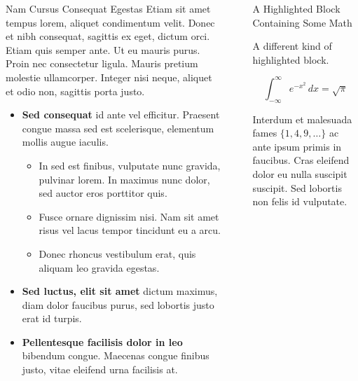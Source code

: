 \documentclass[final,20pt]{beamer}
\newlength{\sepwidth}
\newlength{\colwidth}
\newcommand{\separatorcolumn}{\begin{column}{\sepwidth}\end{column}}
\begin{document}
\begin{frame}[t]
\begin{columns}[t]
\begin{column}{\colwidth}
\begin{block}{Nam Cursus Consequat Egestas}
    Etiam sit amet tempus lorem, aliquet condimentum velit. Donec et nibh
    consequat, sagittis ex eget, dictum orci. Etiam quis semper ante. Ut eu
    mauris purus. Proin nec consectetur ligula. Mauris pretium molestie
    ullamcorper. Integer nisi neque, aliquet et odio non, sagittis porta justo.

    \begin{itemize}
      \item \textbf{Sed consequat} id ante vel efficitur. Praesent congue massa
        sed est scelerisque, elementum mollis augue iaculis.
        \begin{itemize}
          \item In sed est finibus, vulputate nunc gravida, pulvinar lorem. In maximus nunc dolor, sed auctor eros
            porttitor quis.
          \item Fusce ornare dignissim nisi. Nam sit amet risus vel lacus
            tempor tincidunt eu a arcu.
          \item Donec rhoncus vestibulum erat, quis aliquam leo
            gravida egestas.
        \end{itemize}
      \item \textbf{Sed luctus, elit sit amet} dictum maximus, diam dolor
        faucibus purus, sed lobortis justo erat id turpis.
      \item \textbf{Pellentesque facilisis dolor in leo} bibendum congue.
        Maecenas congue finibus justo, vitae eleifend urna facilisis at.
    \end{itemize}

  \end{block}

\end{column}

\separatorcolumn

\begin{column}{\colwidth}

  \begin{exampleblock}{A Highlighted Block Containing Some Math}

    A different kind of highlighted block.

    $$
    \int_{-\infty}^{\infty} e^{-x^2}\,dx = \sqrt{\pi}
    $$

    Interdum et malesuada fames $\{1, 4, 9, \ldots\}$ ac ante ipsum primis in
    faucibus. Cras eleifend dolor eu nulla suscipit suscipit. Sed lobortis non
    felis id vulputate.



\end{exampleblock}
\end{column}
\end{columns}
\end{frame}
\end{document}
